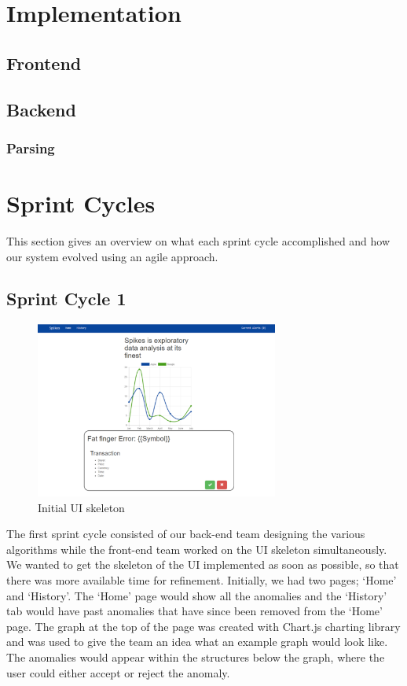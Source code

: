 \documentclass[12pt]{article}
\begin{document}
\section{Implementation}
  \subsection{Frontend}
  \subsection{Backend}
    \subsubsection{Parsing}
\section{Sprint Cycles}
  This section gives an overview on what each sprint cycle accomplished and how our system evolved using an agile approach.
  \subsection{Sprint Cycle 1}
  \begin{figure}[H]
  \centering
  \includegraphics[width=80mm]{sprint1.png}
  \caption{Initial UI skeleton}
  \end{figure}
  The first sprint cycle consisted of our back-end team designing the various algorithms while the front-end team worked on the UI skeleton simultaneously.
  We wanted to get the skeleton of the UI implemented as soon as possible, so that there was more available time for refinement.
  Initially, we had two pages; ‘Home’ and ‘History’. The ‘Home’ page would show all the anomalies and the ‘History’ tab would have past anomalies that have since been removed from the ‘Home’ page.
  The graph at the top of the page was created with Chart.js charting library and was used to give the team an idea what an example graph would look like.
  The anomalies would appear within the structures below the graph, where the user could either accept or reject the anomaly.
\end{document}
